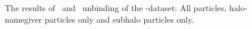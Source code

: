 \begin{subfigures}
\begin{figure}[!htbp]
{\begin{tabular}{|p{.5cm} c c|}
				\hline
			\end{tabular}
			\caption{\label{fig:dice_sub_results_b}
				The results of \neigh\ and \iter\ unbinding of the \ds-dataset: All particles, halo-namegiver particles only and subhalo particles only.
			}
		}
	\end{figure}
	\label{fig:dice_sub_results}
\end{subfigures}




























































